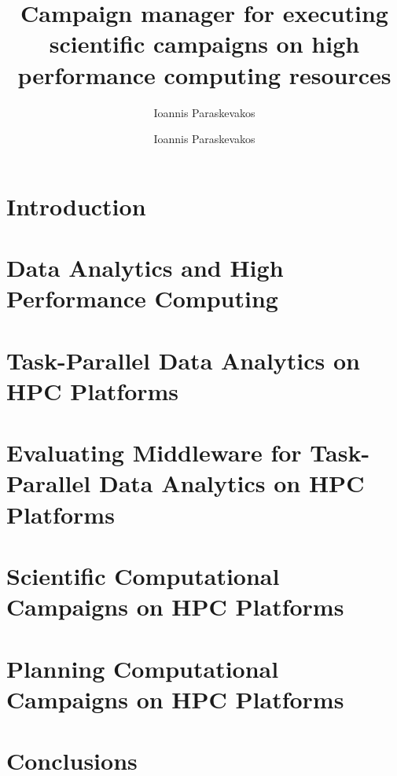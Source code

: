 \documentclass[final]{ruthesis}
\begin{document}
\author{Ioannis Paraskevakos}
\copyrightp
\title{Campaign manager for executing scientific campaigns on high performance computing resources}
\author{Ioannis Paraskevakos}					
\figurespage
\tablespage

\abstract{}
\acknowledgements{}

\beforepreface
\afterpreface

\chapter{Introduction}


\chapter{Data Analytics and High Performance Computing}


\chapter{Task-Parallel Data Analytics on HPC Platforms}


\chapter{Evaluating Middleware for Task-Parallel Data Analytics on HPC Platforms}


\chapter{Scientific Computational Campaigns on HPC Platforms}

\chapter{Planning Computational Campaigns on HPC Platforms}

\chapter{Conclusions}




\end{document}
